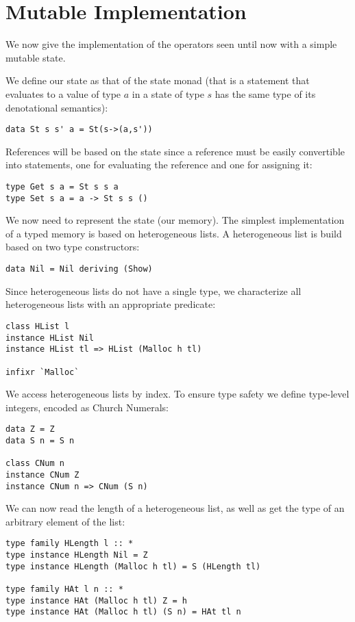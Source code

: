 \section{Mutable Implementation}
We now give the implementation of the operators seen until now with a simple mutable state.

We define our state as that of the state monad (that is a statement that evaluates to a value of type $a$ in a state of type $s$ has the same type of its denotational semantics):
\begin{lstlisting}
data St s s' a = St(s->(a,s'))
\end{lstlisting}

References will be based on the state since a reference must be easily convertible into statements, one for evaluating the reference and one for assigning it:
\begin{lstlisting}
type Get s a = St s s a
type Set s a = a -> St s s ()
\end{lstlisting}

We now need to represent the state (our memory). The simplest implementation of a typed memory is based on heterogeneous lists. A heterogeneous list is build based on two type constructors:
\begin{lstlisting}
data Nil = Nil deriving (Show)
\end{lstlisting}

Since heterogeneous lists do not have a single type, we characterize all heterogeneous lists with an appropriate predicate:
\begin{lstlisting}
class HList l
instance HList Nil
instance HList tl => HList (Malloc h tl)

infixr `Malloc`
\end{lstlisting}

We access heterogeneous lists by index. To ensure type safety we define type-level integers, encoded as Church Numerals:
\begin{lstlisting}
data Z = Z
data S n = S n

class CNum n
instance CNum Z
instance CNum n => CNum (S n)
\end{lstlisting}

We can now read the length of a heterogeneous list, as well as get the type of an arbitrary element of the list:

\begin{lstlisting}
type family HLength l :: *
type instance HLength Nil = Z
type instance HLength (Malloc h tl) = S (HLength tl)

type family HAt l n :: *
type instance HAt (Malloc h tl) Z = h
type instance HAt (Malloc h tl) (S n) = HAt tl n
\end{lstlisting}

